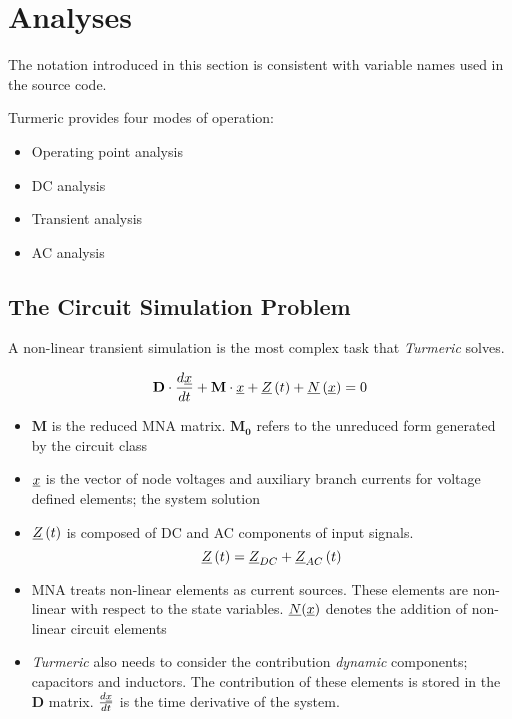 \section{Analyses}
The notation introduced in this section is consistent with variable names used in the \turmeric source code.

Turmeric provides four modes of operation:

\begin{itemize}
    \item Operating point analysis
    \item DC analysis
    \item Transient analysis
    \item AC analysis
\end{itemize}

\subsection{The Circuit Simulation Problem}
A non-linear transient simulation is the most complex task that \textit{Turmeric} solves.

\begin{equation}
    \mathbf{D}\cdot \frac{d\underline{x}}{dt} + \mathbf{M}\cdot \underline{x} + \underline{Z}\left( t\right) + \underline{N}\left(\underline{x}\right) = 0 \label{eq:problem}
\end{equation}

\begin{itemize}
    \item $\mathbf{M}$ is the reduced MNA matrix. $\mathbf{M_0}$ refers to the unreduced form generated by the circuit class
    \item $\underline{x}$ is the vector of node voltages and auxiliary branch currents for voltage defined elements; the system solution
    \item $\underline{Z}\left( t\right)$ is composed of DC and AC components of input signals. \[ \underline{Z}\left(t\right) = \underline{Z}_{DC} + \underline{Z}_{AC}\left(t \right)\]
    \item MNA treats non-linear elements as current sources. These elements are non-linear with respect to the state variables. $\underline{N}(\underline{x})$ denotes the addition of non-linear circuit elements
    \item \textit{Turmeric} also needs to consider the contribution \textit{dynamic} components; capacitors and inductors. The contribution of these elements is stored in the $\mathbf{D}$ matrix. $\frac{d\underline{x}}{dt}$ is the time derivative of the system.
\end{itemize}


